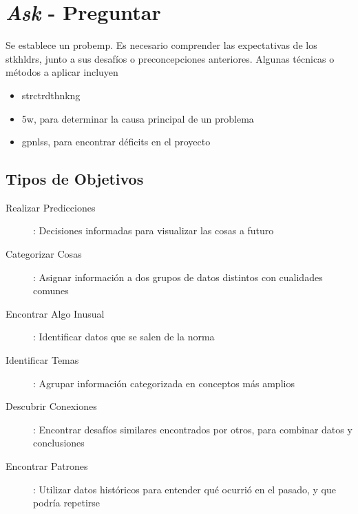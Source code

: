 
\section{\textit{Ask} - Preguntar}
Se establece un \gls{probemp}. Es necesario comprender las expectativas de los \gls{stkhldrs}, junto a sus desafíos o preconcepciones anteriores. Algunas técnicas o métodos a aplicar incluyen
\begin{itemize}
    \item {\gls{strctrdthnkng}}
    \item {\gls{5w}, para determinar la causa principal de un problema}
    \item {\gls{gpnlss}, para encontrar déficits en el proyecto}
\end{itemize}

\subsection{Tipos de Objetivos}
\begin{description}
    \item [Realizar Predicciones]{ : Decisiones informadas para visualizar las cosas a futuro}
    \item [Categorizar Cosas]{ : Asignar información a dos grupos de datos distintos con cualidades comunes}
    \item [Encontrar Algo Inusual]{ : Identificar datos que se salen de la norma}
    \item [Identificar Temas]{ : Agrupar información categorizada en conceptos más amplios}
    \item [Descubrir Conexiones]{ : Encontrar desafíos similares encontrados por otros, para combinar datos y conclusiones}
    \item [Encontrar Patrones]{ : Utilizar datos históricos para entender qué ocurrió en el pasado, y que podría repetirse}
\end{description}


